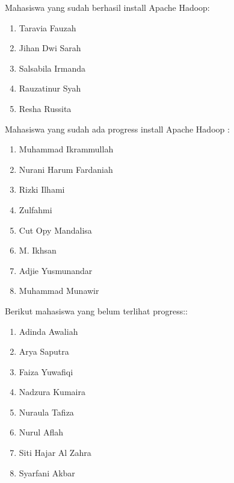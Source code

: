 \documentclass[a4paper]{tufte-handout}
\begin{document}

Mahasiswa yang sudah berhasil install Apache Hadoop:
\begin{multicols}{2}
\begin{enumerate}
\item Taravia Fauzah
\item Jihan Dwi Sarah
\item Salsabila Irmanda
\item Rauzatinur Syah
\item Resha Russita
\end{enumerate}
\end{multicols}

Mahasiswa yang sudah ada progress install Apache Hadoop :
\begin{multicols}{2}
\begin{enumerate}
\item Muhammad Ikrammullah
\item Nurani Harum Fardaniah
\item Rizki Ilhami
\item Zulfahmi
\item Cut Opy Mandalisa
\item M. Ikhsan
\item Adjie Yusmunandar
\item Muhammad Munawir
\end{enumerate}
\end{multicols}

\noindent
Berikut mahasiswa yang belum terlihat progress::
\begin{multicols}{2}
\begin{enumerate}
\item Adinda Awaliah
\item Arya Saputra
\item Faiza Yuwafiqi
\item Nadzura Kumaira
\item Nuraula Tafiza
\item Nurul Aflah
\item Siti Hajar Al Zahra
\item Syarfani Akbar
\end{enumerate}
\end{multicols}

\hrulefill








\clearpage
{}
\end{document}
